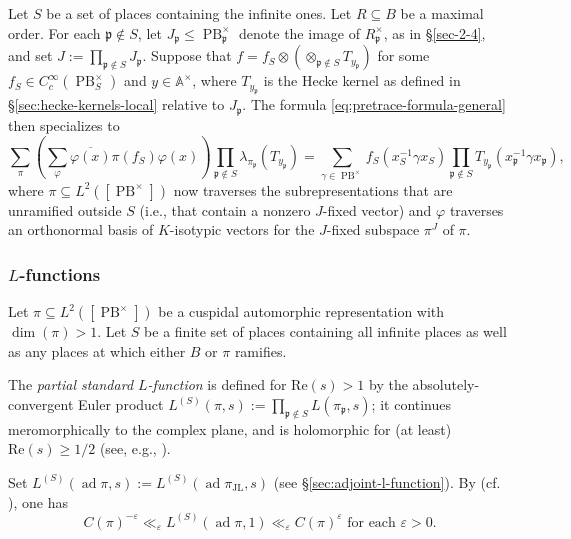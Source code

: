 \documentclass[reqno,10pt]{amsart}
\theoremstyle{plain} %
\theoremstyle{definition}
\theoremstyle{plain} %
\theoremstyle{remark}
\theoremstyle{itplain} %
\theoremstyle{remark} %
\renewcommand{\Re}{\mathrm{Re}}
\renewcommand{\geq}{\geqslant}
\renewcommand{\leq}{\leqslant}
\numberwithin{equation}{section}
\DeclareMathOperator{\ad}{ad}
\DeclareMathOperator{\JL}{JL}
\def\eps{\varepsilon}
\def\PB{\operatorname{PB}}
\begin{document}
Let $S$ be a set of places containing the infinite ones.  Let $R \subseteq B$ be a maximal order.  For each $\mathfrak{p} \notin S$, let $J_\mathfrak{p} \leq \PB^\times_\mathfrak{p}$ denote the image of $R_\mathfrak{p}^\times$, as in \S\ref{sec-2-4}, and set $J := \prod_{\mathfrak{p} \notin S} J_\mathfrak{p}$.
Suppose that $f = f_S \otimes (\otimes_{\mathfrak{p} \notin S} T_{y_\mathfrak{p}})$ for some $f_S \in C_c^\infty(\PB_S^\times)$ and $y \in \mathbb{A}^\times$, where $T_{y_\mathfrak{p}}$ is the Hecke kernel as defined in \S\ref{sec:hecke-kernels-local} relative to $J_\mathfrak{p}$.
The formula \eqref{eq:pretrace-formula-general} then specializes to
\begin{equation}
  \sum_\pi
  (\sum_{\varphi}
  \overline{\varphi(x)}
  \pi(f_S) \varphi(x))
  \prod_{\mathfrak{p} \notin S}
  \lambda_{\pi_\mathfrak{p}}(T_{y_\mathfrak{p}}) 
  =
  \sum_{\gamma \in \PB^\times}
  f_S(x_S^{-1} \gamma x_S)
  \prod_{\mathfrak{p} \notin S}
  T_{y_\mathfrak{p}}(x_\mathfrak{p}^{-1} \gamma x_\mathfrak{p}),
\end{equation}
where $\pi \subseteq L^2([\PB^\times])$ now traverses the subrepresentations that are unramified outside $S$ (i.e., that contain a nonzero $J$-fixed vector) and $\varphi$ traverses an orthonormal basis of $K$-isotypic vectors for the $J$-fixed subspace $\pi^J$ of $\pi$.


\subsubsection{$L$-functions}\label{sec:standard-l-function}
Let $\pi \subseteq L^2([\PB^\times])$ be a cuspidal automorphic representation with $\dim(\pi) > 1$.  Let $S$ be a finite set of places containing all infinite places as well as any places at which either $B$ or $\pi$ ramifies.

The \emph{partial standard $L$-function} is defined for $\Re(s) > 1$ by the absolutely-convergent Euler product $L^{(S)}(\pi,s) := \prod_{\mathfrak{p} \notin S} L(\pi_\mathfrak{p},s)$; it continues meromorphically to the complex plane, and is holomorphic for (at least) $\Re(s) \geq 1/2$ (see, e.g., \cite[\S3.5]{MR1431508}).

Set $L^{(S)}(\ad \pi,s) := L^{(S)}(\ad \pi_{\JL}, s)$ (see \S\ref{sec:adjoint-l-function}).  By \cite{HL94} (cf. \cite[\S 2.9]{2009arXiv0904.2429B}), one has
\begin{equation}\label{eq:HL}
  C(\pi)^{-\eps}  \ll_{\eps} L^{(S)}(\ad \pi,1) \ll_{\eps}
  C(\pi)^{\eps}
  \text{ for each } \eps > 0.
\end{equation}
\end{document}
